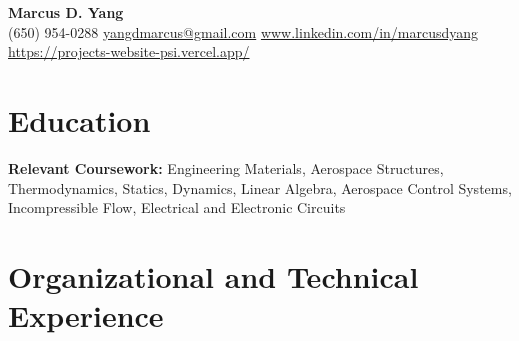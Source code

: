 \newcommand{\entrygap}{\vspace{2pt}}



\begin{center}
  {\fontsize{17}{20}\selectfont\bfseries Marcus D. Yang}\\[2pt]
  {\footnotesize (650) 954-0288 \textbar{} \href{mailto:yangdmarcus@gmail.com}{yangdmarcus@gmail.com} \textbar{} \href{https://www.linkedin.com/in/marcusdyang}{www.linkedin.com/in/marcusdyang} \textbar{} \href{https://projects-website-psi.vercel.app/}{https://projects-website-psi.vercel.app/}}
\end{center}

\section{Education}
\textbf{Relevant Coursework:} Engineering Materials, Aerospace Structures, Thermodynamics, Statics, Dynamics, Linear Algebra, Aerospace Control Systems, Incompressible Flow, Electrical and Electronic Circuits

\section{Organizational and Technical Experience}


